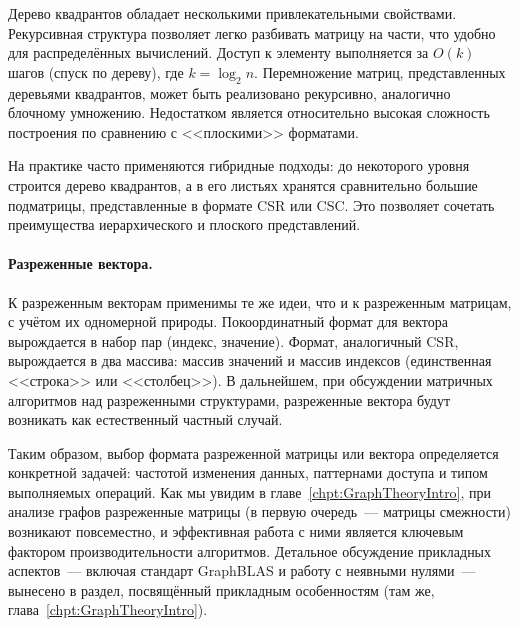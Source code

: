 Дерево квадрантов обладает несколькими привлекательными свойствами.
Рекурсивная структура позволяет легко разбивать матрицу на части, что удобно для распределённых вычислений.
Доступ к элементу выполняется за $O(k)$ шагов (спуск по дереву), где $k = \log_2 n$.
Перемножение матриц, представленных деревьями квадрантов, может быть реализовано рекурсивно, аналогично блочному умножению.
Недостатком является относительно высокая сложность построения по сравнению с <<плоскими>> форматами.

На практике часто применяются гибридные подходы: до некоторого уровня строится дерево квадрантов, а в его листьях хранятся сравнительно большие подматрицы, представленные в формате CSR или CSC.
Это позволяет сочетать преимущества иерархического и плоского представлений.

\paragraph{Разреженные вектора.}
К разреженным векторам применимы те же идеи, что и к разреженным матрицам, с учётом их одномерной природы.
Покоординатный формат для вектора вырождается в набор пар (индекс, значение).
Формат, аналогичный CSR, вырождается в два массива: массив значений и массив индексов (единственная <<строка>> или <<столбец>>).
В дальнейшем, при обсуждении матричных алгоритмов над разреженными структурами, разреженные вектора будут возникать как естественный частный случай.

Таким образом, выбор формата разреженной матрицы или вектора определяется конкретной задачей: частотой изменения данных, паттернами доступа и типом выполняемых операций.
Как мы увидим в главе~\ref{chpt:GraphTheoryIntro}, при анализе графов разреженные матрицы (в первую очередь~--- матрицы смежности) возникают повсеместно, и эффективная работа с ними является ключевым фактором производительности алгоритмов.
Детальное обсуждение прикладных аспектов~--- включая стандарт GraphBLAS и работу с неявными нулями~--- вынесено в раздел, посвящённый прикладным особенностям (там же, глава~\ref{chpt:GraphTheoryIntro}).
